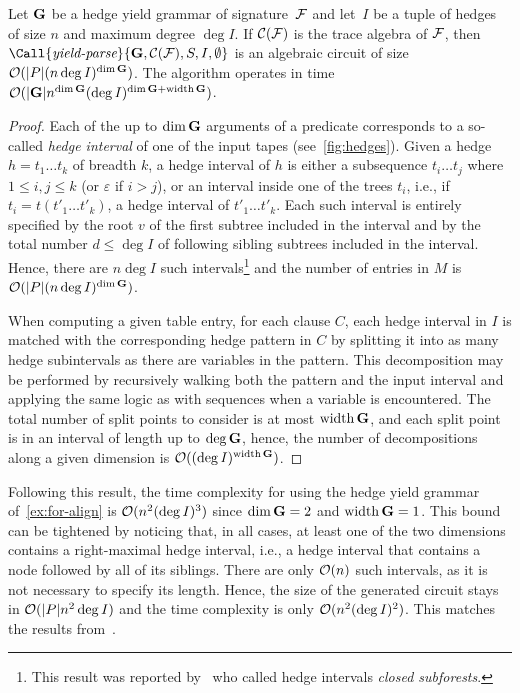 \begin{theorem}\label{thm:adp:gram-hedge-complex}
    Let \(\gram\) be a hedge yield grammar of signature~\(\algsign\) and let~\(I\) be a tuple of hedges of size \(n\) and maximum degree \(\deg I\).
    If \(\altrace(\algsign)\) is the trace algebra of \(\algsign\), then \(\Call{\emph{yield-parse}}{\gram, \altrace(\algsign), S, I, \emptyset}\) is an algebraic circuit of size \(\bigo(|P| (n \deg{I})^{\dim \gram})\).
    The algorithm operates in time \(\bigo(|\gram| n^{\dim\gram}(\deg I)^{\dim\gram+\width\gram})\).
\end{theorem}
\begin{proof}
    Each of the up to \(\dim\gram\) arguments of a predicate corresponds to a so-called \emph{hedge interval} of one of the input tapes (see~\cref{fig:hedges}).
    Given a hedge \(h = t_1 \ldots t_k\) of breadth \(k\), a hedge interval of \(h\) is either a subsequence \(t_i \ldots t_j\) where \(1 \le i, j \le k\) (or \(\varepsilon\) if \(i > j\)), or an interval inside one of the trees \(t_i\), i.e., if \(t_i = t(t'_1 \ldots t'_k)\), a hedge interval of  \(t'_1 \ldots t'_k\).
    Each such interval is entirely specified by the root \(v\) of the first subtree included in the interval and by the total number \(d \le \deg I\) of following sibling subtrees included in the interval.
    Hence, there are \(n\deg{I}\) such intervals\footnote{This result was reported by~\textcite{Hochsmann2003LocalSimilarityRNA} who called hedge intervals \emph{closed subforests}.} and the number of entries in \(M\) is \(\bigo(|P| (n\deg{I})^{\dim\gram})\).

    When computing a given table entry, for each clause \(C\), each hedge interval in \(I\) is matched with the corresponding hedge pattern in \(C\) by splitting it into as many hedge subintervals as there are variables in the pattern.
    This decomposition may be performed by recursively walking both the pattern and the input interval and applying the same logic as with sequences when a variable is encountered.
    The total number of split points to consider is at most \(\width\gram\), and each split point is in an interval of length up to \(\deg\gram\), hence, the number of decompositions along a given dimension is \(\bigo((\deg I)^{\width\gram})\).
\end{proof}

Following this result, the time complexity for using the hedge yield grammar of~\cref{ex:for-align} is \(\bigo(n^2(\deg I)^3)\) since \(\dim\gram = 2\) and \(\width\gram = 1\).
This bound can be tightened by noticing that, in all cases, at least one of the two dimensions contains a right-maximal hedge interval, i.e., a hedge interval that contains a node followed by all of its siblings.
There are only \(\bigo(n)\) such intervals, as it is not necessary to specify its length.
Hence, the size of the generated circuit stays in \(\bigo(|P|n^2\deg{I})\) and the time complexity is only \(\bigo(n^2(\deg I)^2)\).
This matches the results from~\textcite{Jiang1995AlignmentTreesAlternative}.

